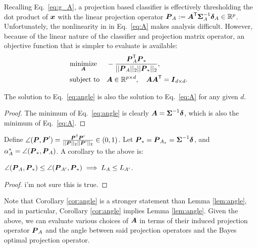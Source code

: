 \documentclass[10pt]{article}
\begin{document}
Recalling Eq.~\eqref{eq:g_A}, a projection based classifier is effectively thresholding the dot product of $\boldsymbol{x}$ with the linear projection operator $\boldsymbol{P}_A :=\boldsymbol{A}^{\mathsf{T}} \boldsymbol{\Sigma}_A^{-1} \boldsymbol{\delta}_A \in \mathbb{R}^p$.  Unfortunately, the nonlinearity in in Eq.~\eqref{eq:A} makes analysis difficult.
However, because of the linear nature of the classifier and projection matrix operator, an objective function that is simpler to evaluate is available: 
\begin{equation} \label{eq:angle}
\begin{aligned}
& \underset{\boldsymbol{A}}{\text{minimize}}
& & -\frac{ \boldsymbol{P}_A^{\mathsf{T}} \boldsymbol{P}_*}{||\boldsymbol{P}_A||_2 ||\boldsymbol{P}_*||_2}, 
\\ & \text{subject to} & & \boldsymbol{A} \in \mathbb{R}^{p \times d}, \quad \boldsymbol{A} \boldsymbol{A}^{\mathsf{T}} = \boldsymbol{I}_{d \times d}.
\end{aligned}
\end{equation}

\begin{lem} \label{lem:angle}
The solution to Eq.~\eqref{eq:angle} is also the solution to Eq.~\eqref{eq:A} for any given $d$.
\end{lem}

\begin{proof}
The minimum of Eq.~\eqref{eq:angle} is clearly $\boldsymbol{A}=\boldsymbol{\Sigma}^{-1} \boldsymbol{\delta}$, which is also the minimum of Eq.~\eqref{eq:A}.
\end{proof}

Define 
$\angle(\boldsymbol{P},\boldsymbol{P}') = \frac{ \boldsymbol{P}^{\mathsf{T}} \boldsymbol{P}'}{||\boldsymbol{P}||_2 ||\boldsymbol{P}'||_2} \in (0,1)$.
Let $\boldsymbol{P}_*=\boldsymbol{P}_{A_*}=\boldsymbol{\Sigma}^{-1} \boldsymbol{\delta}$, 
and $\alpha^*_A=\angle(\boldsymbol{P}_*,\boldsymbol{P}_A)$. 
A corollary to the above is:
\begin{cor} \label{cor:angle}
$\angle(\boldsymbol{P}_A,\boldsymbol{P}_*) \leq \angle(\boldsymbol{P}_{A'},\boldsymbol{P}_*) \implies L_A \leq L_{A'}$.
\end{cor}

\begin{proof}
i'm not sure this is true.
\end{proof}

Note that Corollary \ref{cor:angle} is a stronger statement than Lemma \ref{lem:angle}, and in particular, Corollary \ref{cor:angle} implies Lemma \ref{lem:angle}.
Given the above, we can evaluate various choices of $\boldsymbol{A}$ in terms of their induced projection operator $\boldsymbol{P}_A$ and the angle between said projection operators and the Bayes optimal projection operator.  

\end{document}
